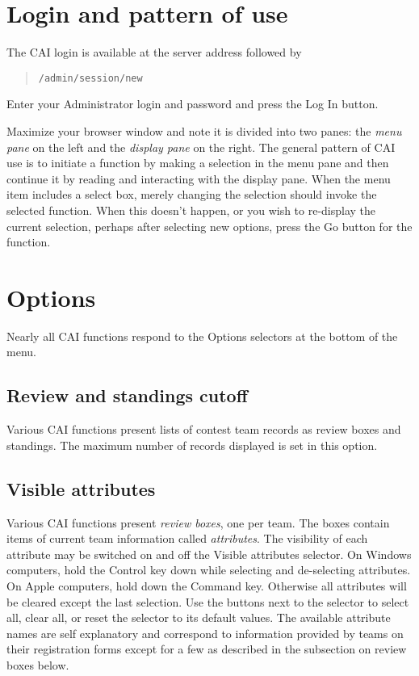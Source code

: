 \documentclass[11pt,letterpaper]{refart}
\def\ui#1{\textsf{#1}}
\begin{document}
\section{Login and pattern of use}
The CAI login is available at the server address followed by
\begin{quote} 
\texttt{/admin/session/new}
\end{quote}
Enter your Administrator login and password and press the Log In button.

Maximize your browser window and note it is divided into two panes: the \emph{menu pane}
on the left and the \emph{display pane} on the right.  The general pattern of CAI use is
to initiate a function by making a selection in the menu pane and then continue it
by reading and interacting with the display pane.  When the menu item includes
a select box, merely changing the selection should invoke the selected function.
When this doesn't happen, or you wish to re-display the current selection, perhaps 
after selecting new options, press the  \ui{Go} button for the function.

\section{Options}
Nearly all CAI functions respond to the \ui{Options} selectors 
at the bottom of the menu. 

\subsection{Review and standings cutoff}
Various CAI functions present lists of contest team records as review boxes and 
standings.  The maximum number of records displayed is set in this option.
 
\subsection{Visible attributes}
Various CAI functions present \emph{review boxes}, one per team.  The boxes
contain items of current team information called \emph{attributes}.  
The visibility of each attribute may be switched on and off the 
\ui{Visible attributes} selector. On Windows computers, 
hold the Control key down while selecting and de-selecting attributes.  On Apple
computers, hold down the Command key.  Otherwise
all attributes will be cleared except the last selection.  Use the buttons next to 
the selector to select all, clear all, or reset the selector to its default values. The
available attribute names are self explanatory and correspond to information
provided by teams on their registration forms except for a few as described
in the subsection on review boxes below.
\end{document}
